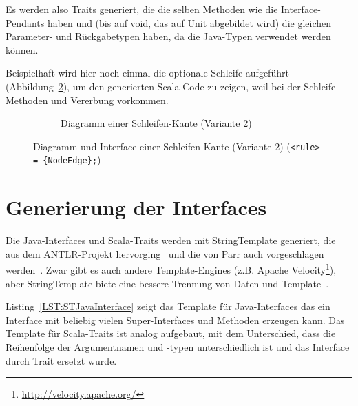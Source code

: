 \documentclass[../InterneDSLs.tex]{subfiles}
\begin{document}
Es werden also Traits generiert, die die selben Methoden wie die Interface-Pendants haben und (bis auf void, das auf Unit abgebildet wird) die gleichen Parameter- und Rückgabetypen haben, da die Java-Typen verwendet werden können.

Beispielhaft wird hier noch einmal die optionale Schleife aufgeführt (Abbildung~\ref{FIG:ScalaLoopNodeAlt}), um den generierten Scala-Code zu zeigen, weil bei der Schleife Methoden und Vererbung vorkommen.
\begin{figure}[ht]
\centering
  \begin{subfigure}[c]{0.49\textwidth}
    \caption{Diagramm einer Schleifen-Kante (Variante 2)}
    \label{FIG:ScalaDiagramLoopNodeAlt}
  \end{subfigure}
  \begin{subfigure}[c]{0.49\textwidth}
    
  \end{subfigure}
  \caption{Diagramm und Interface einer Schleifen-Kante (Variante 2) (\texttt{<rule> = \{NodeEdge\};})}
  \label{FIG:ScalaLoopNodeAlt}
\end{figure}


\section{Generierung der Interfaces}
Die Java-Interfaces und Scala-Traits werden mit StringTemplate generiert, die aus dem ANTLR-Projekt hervorging~\cite{stringtemplate.github} und die von Parr auch vorgeschlagen werden~\cite[S. 313 ff]{Parr.2010}. Zwar gibt es auch andere Template-Engines (z.B. Apache Velocity\footnote{\url{http://velocity.apache.org/}}), aber StringTemplate biete eine bessere Trennung von Daten und Template~\cite{parr2004enforcing}.

Listing~\ref{LST:STJavaInterface} zeigt das Template für Java-Interfaces das ein Interface mit beliebig vielen Super-Interfaces und Methoden erzeugen kann. Das Template für Scala-Traits ist analog aufgebaut, mit dem Unterschied, dass die Reihenfolge der Argumentnamen und -typen unterschiedlich ist und das Interface durch Trait ersetzt wurde.
\end{document}
